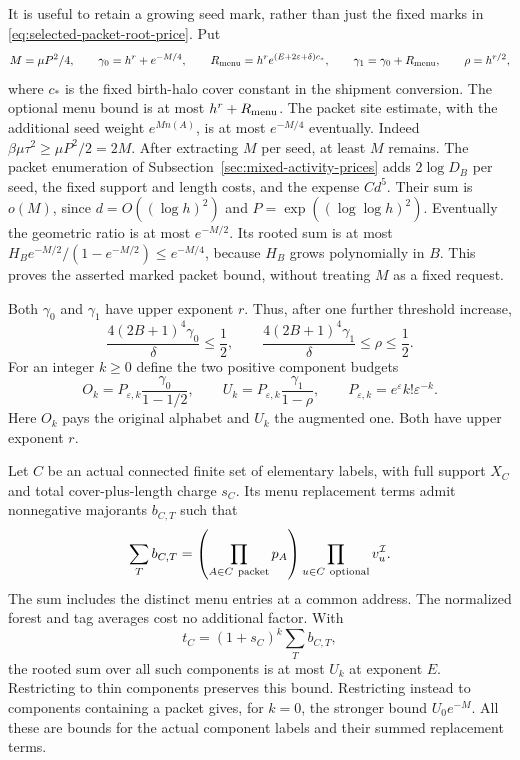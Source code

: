 It is useful to retain a growing seed mark, rather than just the fixed
marks in \eqref{eq:selected-packet-root-price}. Put
\[
 M=\mu P^2/4,\qquad
 \gamma_0=h^r+e^{-M/4},\qquad
 R_{\rm menu}=h^r e^{(E+2\varepsilon+\delta)c_*},\qquad
 \gamma_1=\gamma_0+R_{\rm menu},\qquad \rho=h^{r/2},
\]
where $c_*$ is the fixed birth-halo cover constant in the shipment
conversion. The optional menu bound is at most $h^r+R_{\rm menu}$.
The packet site estimate, with the additional seed weight
$e^{Mn(A)}$, is at most $e^{-M/4}$ eventually. Indeed
$\beta\mu\tau^2\ge\mu P^2/2=2M$. After extracting $M$ per seed,
at least $M$ remains. The packet enumeration of
Subsection~\ref{sec:mixed-activity-prices} adds $2\log D_B$ per seed,
the fixed support and length costs, and the expense $Cd^5$.
Their sum is $o(M)$, since $d=O((\log h)^2)$ and
$P=\exp((\log\log h)^2)$. Eventually the geometric ratio is at
most $e^{-M/2}$. Its rooted sum is at most
$H_B e^{-M/2}/(1-e^{-M/2})\le e^{-M/4}$, because $H_B$ grows
polynomially in $B$. This proves the asserted marked packet bound,
without treating $M$ as a fixed request.

Both $\gamma_0$ and $\gamma_1$ have upper exponent $r$. Thus,
after one further threshold increase,
\[
 \frac{4(2B+1)^4\gamma_0}{\delta}\le\frac12,
 \qquad
 \frac{4(2B+1)^4\gamma_1}{\delta}\le\rho\le\frac12.
\]
For an integer $k\ge0$ define the two positive component budgets
\begin{equation}\label{eq:selected-component-budgets}
 O_k=P_{\varepsilon,k}\frac{\gamma_0}{1-1/2},\qquad
 U_k=P_{\varepsilon,k}\frac{\gamma_1}{1-\rho},\qquad
 P_{\varepsilon,k}=e^\varepsilon k!\varepsilon^{-k}.
\end{equation}
Here $O_k$ pays the original alphabet and $U_k$ the augmented one.
Both have upper exponent $r$.

\begin{lemma}
\label{lem:selected-component-fibers}
Let $C$ be an actual connected finite set of elementary labels, with
full support $X_C$ and total cover-plus-length charge $s_C$.
Its menu replacement terms admit nonnegative majorants $b_{C,T}$
such that
\begin{equation}\label{eq:selected-component-fiber}
 \sum_T b_{C,T}
   =\left(\prod_{A\in C\ {\rm packet}}p_A\right)
       \prod_{u\in C\ {\rm optional}}v_u^{\mathcal I}.
\end{equation}
The sum includes the distinct menu entries at a common address.
The normalized forest and tag averages cost no additional factor.
With
\[
 t_C=(1+s_C)^k\sum_T b_{C,T},
\]
the rooted sum over all such components is at most $U_k$ at
exponent $E$. Restricting to thin components preserves this bound.
Restricting instead to components containing a packet gives, for
$k=0$, the stronger bound $U_0e^{-M}$. All these are bounds for the
actual component labels and their summed replacement terms.
\end{lemma}


